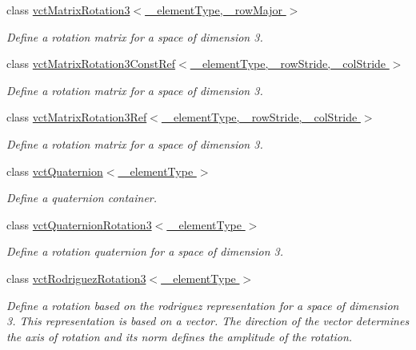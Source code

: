 \begin{DoxyCompactItemize}
class \hyperlink{classvct_matrix_rotation3}{vct\+Matrix\+Rotation3$<$ \+\_\+element\+Type, \+\_\+row\+Major $>$}
\begin{DoxyCompactList}\small\item\em Define a rotation matrix for a space of dimension 3. \end{DoxyCompactList}\item 
class \hyperlink{classvct_matrix_rotation3_const_ref}{vct\+Matrix\+Rotation3\+Const\+Ref$<$ \+\_\+element\+Type, \+\_\+row\+Stride, \+\_\+col\+Stride $>$}
\begin{DoxyCompactList}\small\item\em Define a rotation matrix for a space of dimension 3. \end{DoxyCompactList}\item 
class \hyperlink{classvct_matrix_rotation3_ref}{vct\+Matrix\+Rotation3\+Ref$<$ \+\_\+element\+Type, \+\_\+row\+Stride, \+\_\+col\+Stride $>$}
\begin{DoxyCompactList}\small\item\em Define a rotation matrix for a space of dimension 3. \end{DoxyCompactList}\item 
class \hyperlink{classvct_quaternion}{vct\+Quaternion$<$ \+\_\+element\+Type $>$}
\begin{DoxyCompactList}\small\item\em Define a quaternion container. \end{DoxyCompactList}\item 
class \hyperlink{classvct_quaternion_rotation3}{vct\+Quaternion\+Rotation3$<$ \+\_\+element\+Type $>$}
\begin{DoxyCompactList}\small\item\em Define a rotation quaternion for a space of dimension 3. \end{DoxyCompactList}\item 
class \hyperlink{classvct_rodriguez_rotation3}{vct\+Rodriguez\+Rotation3$<$ \+\_\+element\+Type $>$}
\begin{DoxyCompactList}\small\item\em Define a rotation based on the rodriguez representation for a space of dimension 3. This representation is based on a vector. The direction of the vector determines the axis of rotation and its norm defines the amplitude of the rotation. \end{DoxyCompactList}\end{DoxyCompactItemize}
